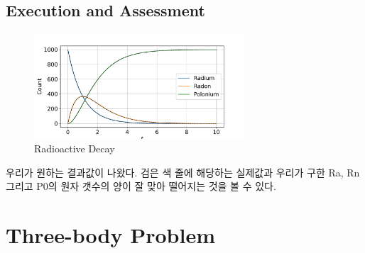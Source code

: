\documentclass[11pt]{article}
\begin{document}
\subsection{Execution and Assessment}
\begin{figure}[!ht]
  \centering
  \includegraphics[width=0.7\textwidth]{Radium.pdf}
  \caption{Radioactive Decay}
\end{figure}
우리가 원하는 결과값이 나왔다. 검은 색 줄에 해당하는 실제값과 우리가 구한 Ra, Rn 그리고 P0의 원자 갯수의 양이 잘 맞아 떨어지는 것을 볼 수 있다.










\section{Three-body Problem}
\end{document}
